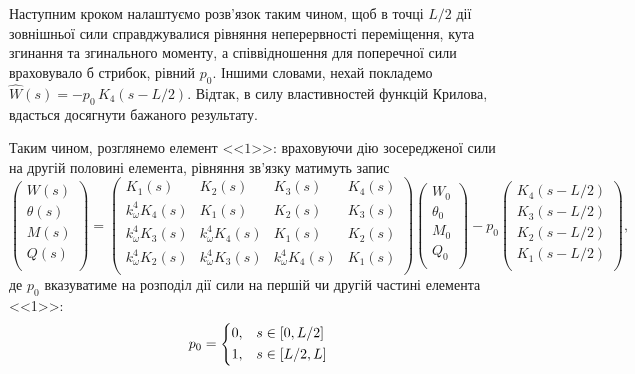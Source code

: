 Наступним кроком налаштуємо розв'язок таким чином, щоб в точці $L/2$ дії зовнішньої сили справджувалися рівняння неперервності переміщення, кута згинання та згинального моменту, а співвідношення для поперечної сили враховувало б стрибок, рівний $p_0$. Іншими словами, нехай покладемо $\widehat{W}(s)=-p_0\, K_4(s-L/2)$. Відтак, в силу властивностей функцій Крилова, вдасться досягнути бажаного результату. 

\newpage
Таким чином, розглянемо елемент <<$1$>>: враховуючи дію зосередженої сили на другій половині елемента, рівняння зв'язку матимуть запис
\begin{equation}\label{eq: matrix inhomo field equations for element 1}
    \begin{pmatrix}
        W(s)      \\
        \theta(s) \\
        M(s)      \\
        Q(s)      \\
    \end{pmatrix} =
    \begin{pmatrix}
        K_1(s)              & K_2(s)              & K_3(s)              & K_4(s) \\
        k_{\omega}^4 K_4(s) & K_1(s)              & K_2(s)              & K_3(s) \\
        k_{\omega}^4 K_3(s) & k_{\omega}^4 K_4(s) & K_1(s)              & K_2(s) \\
        k_{\omega}^4 K_2(s) & k_{\omega}^4 K_3(s) & k_{\omega}^4 K_4(s) & K_1(s) \\
    \end{pmatrix}
    \begin{pmatrix}
        W_0      \\
        \theta_0 \\
        M_0      \\
        Q_0      \\
    \end{pmatrix} - p_0
    \begin{pmatrix}
        K_4(s-L/2)   \\
        K_3(s-L/2)   \\
        K_2(s-L/2)   \\
        K_1(s-L/2)   \\
    \end{pmatrix},
\end{equation}
де $p_0$ вказуватиме на розподіл дії сили на першій чи другій частині елемента <<1>>:
\begin{align}\label{eq: gamma}
    p_0 = 
    \begin{cases*}
        0, & $s \in [0,L/2]$ \\ 
        1, & $s \in [L/2,L]$ \\ 
    \end{cases*}
\end{align}

